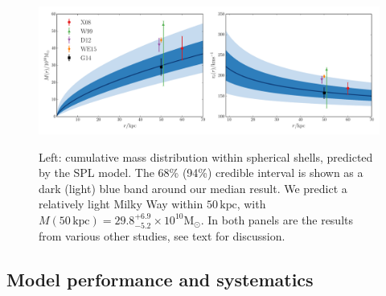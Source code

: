 \documentclass[useAMS,twocolumn,usenatbib]{mn2e}
\def\kpc{{\,\mathrm{kpc}}}
\begin{document}
\begin{figure}
\includegraphics[width=2\columnwidth]{plots/spherical_powerlaw_massenclosed}\\
\caption{Left: cumulative mass distribution within spherical shells, predicted by the SPL model. 
The 68\% (94\%) credible interval is shown as a dark (light) blue band around our median result. 
We predict a relatively light Milky Way within $50\kpc$, with $M(50\kpc)=29.8^{+6.9}_{-5.2} \times 10^{10}\mathrm{M}_\odot$. 
In both panels are the results from various other studies, see text for discussion.}
\label{fig:mass}
\end{figure}


\subsection{Model performance and systematics}
\label{sec:model_performance}
\end{document}
